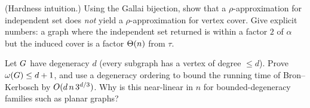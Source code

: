 \begin{exercise}
(Hardness intuition.) Using the Gallai bijection, show that a
$\rho$-approximation for independent set does \emph{not} yield a
$\rho$-approximation for vertex cover. Give explicit numbers: a graph where the
independent set returned is within a factor $2$ of $\alpha$ but the induced cover
is a factor $\Theta(n)$ from $\tau$.
\end{exercise}

\begin{exercise}
Let $G$ have degeneracy $d$ (every subgraph has a vertex of degree $\le d$).
Prove $\omega(G)\le d+1$, and use a degeneracy ordering to bound the running
time of Bron--Kerbosch by $O(d\,n\,3^{d/3})$. Why is this near-linear in $n$ for
bounded-degeneracy families such as planar graphs?
\end{exercise}
